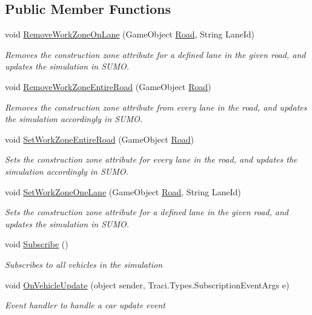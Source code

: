 \subsection*{Public Member Functions}
\begin{DoxyCompactItemize}
\item 
void \mbox{\hyperlink{class_traci_controller_adc26e9e3e188ed89f864b2e4ab8a3393}{Remove\+Work\+Zone\+On\+Lane}} (Game\+Object \mbox{\hyperlink{struct_road}{Road}}, String Lane\+Id)
\begin{DoxyCompactList}\small\item\em Removes the construction zone attribute for a defined lane in the given road, and updates the simulation in S\+U\+MO. \end{DoxyCompactList}\item 
void \mbox{\hyperlink{class_traci_controller_ac1f189c21103504c425bd572a1634759}{Remove\+Work\+Zone\+Entire\+Road}} (Game\+Object \mbox{\hyperlink{struct_road}{Road}})
\begin{DoxyCompactList}\small\item\em Removes the construction zone attribute from every lane in the road, and updates the simulation accordingly in S\+U\+MO. \end{DoxyCompactList}\item 
void \mbox{\hyperlink{class_traci_controller_af0beb4c7ca635ebdd090f05e42770deb}{Set\+Work\+Zone\+Entire\+Road}} (Game\+Object \mbox{\hyperlink{struct_road}{Road}})
\begin{DoxyCompactList}\small\item\em Sets the construction zone attribute for every lane in the road, and updates the simulation accordingly in S\+U\+MO. \end{DoxyCompactList}\item 
void \mbox{\hyperlink{class_traci_controller_a0a9b38a43070487d3a2578d36e5d105a}{Set\+Work\+Zone\+One\+Lane}} (Game\+Object \mbox{\hyperlink{struct_road}{Road}}, String Lane\+Id)
\begin{DoxyCompactList}\small\item\em Sets the construction zone attribute for a defined lane in the given road, and updates the simulation in S\+U\+MO. \end{DoxyCompactList}\item 
void \mbox{\hyperlink{class_traci_controller_aacc5a9530481fe986ee9329f07e4eccd}{Subscribe}} ()
\begin{DoxyCompactList}\small\item\em Subscribes to all vehicles in the simulation \end{DoxyCompactList}\item 
void \mbox{\hyperlink{class_traci_controller_ae059ca6ccc3a8ce34a4d133de3d5fade}{On\+Vehicle\+Update}} (object sender, Traci.\+Types.\+Subscription\+Event\+Args e)
\begin{DoxyCompactList}\small\item\em Event handler to handle a car update event \end{DoxyCompactList}\end{DoxyCompactItemize}
